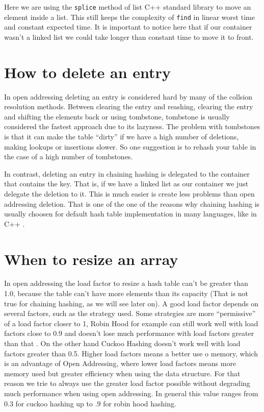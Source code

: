 Here we are using the \texttt{splice} method of list C++ standard library to move an element inside a list. This still keeps the complexity of \texttt{find} in linear worst time and constant expected time. It is important to notice here that if our container wasn't a linked list we could take longer than constant time to move it to front.


\section{How to delete an entry}

In open addressing deleting an entry is considered hard by many of the collsion resolution methods. Between clearing the entry and reashing, clearing the entry and shifting the elements back or using tombstone, tombstone is usually considered the fastest approach due to its lazyness.
The problem with tombstones is that it can make the table ``dirty'' if we have a high number of deletions, making lookups or insertions slower. So one suggestion is to rehash your table in the case of a high number of tombstones.

In contrast, deleting an entry in chaining hashing is delegated to the container that contains the key. That is, if we have a linked list as our container we just delegate the deletion to it. This is much easier is create less problems than open addressing deletion. That is one of the one of the reasons why chaining hashing is usually choosen for default hash table implementation in many languages, like in C++ \citep{UnorderedMapDiscussion}.

\section{When to resize an array}

In open addressing the load factor to resize a hash table can't be greater than 1.0, because the table can't have more elements than its capacity (That is not true for chaining hashing, as we will see later on). A good load factor depends on several factors, such as the strategy used. Some strategies are more ``permissive'' of a load factor closer to 1, Robin Hood for example can still work well with load factors close to 0.9 and doesn't lose much performance with load factors greater than that \citep{RobinHoodDefault}. On the other hand Cuckoo Hashing doesn't work well with load factors greater than 0.5. Higher load factors means a better use o memory, which is an advantage of Open Addressing, where lower load factors means more memory used but greater efficiency when using the data structure. For that reason we trie to always use the greater load factor possible without degrading much performance when using open addressing. In general this value ranges from 0.3 for cuckoo hashing up to .9 for robin hood hashing.

